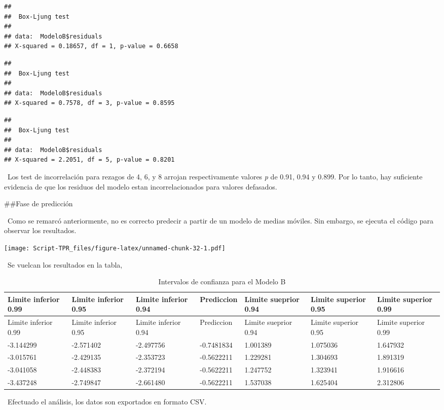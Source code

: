 \documentclass[]{article}
\begin{document}
\begin{verbatim}
## 
##  Box-Ljung test
## 
## data:  ModeloB$residuals
## X-squared = 0.18657, df = 1, p-value = 0.6658
\end{verbatim}

\begin{verbatim}
## 
##  Box-Ljung test
## 
## data:  ModeloB$residuals
## X-squared = 0.7578, df = 3, p-value = 0.8595
\end{verbatim}

\begin{verbatim}
## 
##  Box-Ljung test
## 
## data:  ModeloB$residuals
## X-squared = 2.2051, df = 5, p-value = 0.8201
\end{verbatim}

~Los test de incorrelación para rezagos de 4, 6, y 8 arrojan
respectivamente valores \emph{p} de 0.91, 0.94 y 0.899. Por lo tanto,
hay suficiente evidencia de que los residuos del modelo estan
incorrelacionados para valores defasados.

\#\#Fase de predicción

~Como se remarcó anteriormente, no es correcto predecir a partir de un
modelo de medias móviles. Sin embargo, se ejecuta el código para
observar los resultados.

\texttt{[image: Script-TPR\_files/figure-latex/unnamed-chunk-32-1.pdf]}

~Se vuelcan los resultados en la tabla,

\begin{longtable}[]{@{}lllllll@{}}
\caption{Intervalos de confianza para el Modelo B}\tabularnewline
\toprule
Limite inferior 0.99 & Limite inferior 0.95 & Limite inferior 0.94 &
Prediccion & Limite sueprior 0.94 & Limite superior 0.95 & Limite
superior 0.99\tabularnewline
\midrule
\endfirsthead
\toprule
Limite inferior 0.99 & Limite inferior 0.95 & Limite inferior 0.94 &
Prediccion & Limite sueprior 0.94 & Limite superior 0.95 & Limite
superior 0.99\tabularnewline
\midrule
\endhead
-3.144299 & -2.571402 & -2.497756 & -0.7481834 & 1.001389 & 1.075036 &
1.647932\tabularnewline
-3.015761 & -2.429135 & -2.353723 & -0.5622211 & 1.229281 & 1.304693 &
1.891319\tabularnewline
-3.041058 & -2.448383 & -2.372194 & -0.5622211 & 1.247752 & 1.323941 &
1.916616\tabularnewline
-3.437248 & -2.749847 & -2.661480 & -0.5622211 & 1.537038 & 1.625404 &
2.312806\tabularnewline
\bottomrule
\end{longtable}

~Efectuado el análisis, los datos son exportados en formato CSV.
\end{document}
